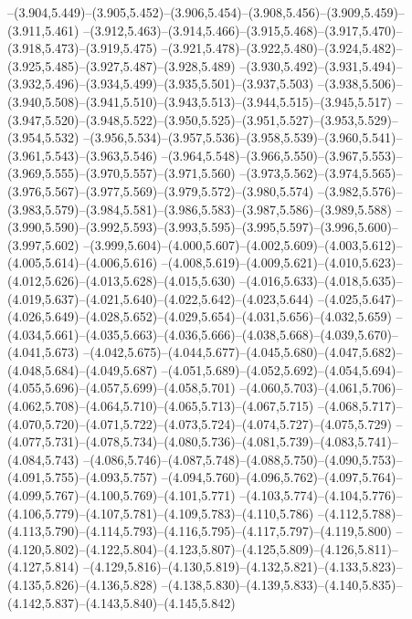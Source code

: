   --(3.904,5.449)--(3.905,5.452)--(3.906,5.454)--(3.908,5.456)--(3.909,5.459)--(3.911,5.461)%
  --(3.912,5.463)--(3.914,5.466)--(3.915,5.468)--(3.917,5.470)--(3.918,5.473)--(3.919,5.475)%
  --(3.921,5.478)--(3.922,5.480)--(3.924,5.482)--(3.925,5.485)--(3.927,5.487)--(3.928,5.489)%
  --(3.930,5.492)--(3.931,5.494)--(3.932,5.496)--(3.934,5.499)--(3.935,5.501)--(3.937,5.503)%
  --(3.938,5.506)--(3.940,5.508)--(3.941,5.510)--(3.943,5.513)--(3.944,5.515)--(3.945,5.517)%
  --(3.947,5.520)--(3.948,5.522)--(3.950,5.525)--(3.951,5.527)--(3.953,5.529)--(3.954,5.532)%
  --(3.956,5.534)--(3.957,5.536)--(3.958,5.539)--(3.960,5.541)--(3.961,5.543)--(3.963,5.546)%
  --(3.964,5.548)--(3.966,5.550)--(3.967,5.553)--(3.969,5.555)--(3.970,5.557)--(3.971,5.560)%
  --(3.973,5.562)--(3.974,5.565)--(3.976,5.567)--(3.977,5.569)--(3.979,5.572)--(3.980,5.574)%
  --(3.982,5.576)--(3.983,5.579)--(3.984,5.581)--(3.986,5.583)--(3.987,5.586)--(3.989,5.588)%
  --(3.990,5.590)--(3.992,5.593)--(3.993,5.595)--(3.995,5.597)--(3.996,5.600)--(3.997,5.602)%
  --(3.999,5.604)--(4.000,5.607)--(4.002,5.609)--(4.003,5.612)--(4.005,5.614)--(4.006,5.616)%
  --(4.008,5.619)--(4.009,5.621)--(4.010,5.623)--(4.012,5.626)--(4.013,5.628)--(4.015,5.630)%
  --(4.016,5.633)--(4.018,5.635)--(4.019,5.637)--(4.021,5.640)--(4.022,5.642)--(4.023,5.644)%
  --(4.025,5.647)--(4.026,5.649)--(4.028,5.652)--(4.029,5.654)--(4.031,5.656)--(4.032,5.659)%
  --(4.034,5.661)--(4.035,5.663)--(4.036,5.666)--(4.038,5.668)--(4.039,5.670)--(4.041,5.673)%
  --(4.042,5.675)--(4.044,5.677)--(4.045,5.680)--(4.047,5.682)--(4.048,5.684)--(4.049,5.687)%
  --(4.051,5.689)--(4.052,5.692)--(4.054,5.694)--(4.055,5.696)--(4.057,5.699)--(4.058,5.701)%
  --(4.060,5.703)--(4.061,5.706)--(4.062,5.708)--(4.064,5.710)--(4.065,5.713)--(4.067,5.715)%
  --(4.068,5.717)--(4.070,5.720)--(4.071,5.722)--(4.073,5.724)--(4.074,5.727)--(4.075,5.729)%
  --(4.077,5.731)--(4.078,5.734)--(4.080,5.736)--(4.081,5.739)--(4.083,5.741)--(4.084,5.743)%
  --(4.086,5.746)--(4.087,5.748)--(4.088,5.750)--(4.090,5.753)--(4.091,5.755)--(4.093,5.757)%
  --(4.094,5.760)--(4.096,5.762)--(4.097,5.764)--(4.099,5.767)--(4.100,5.769)--(4.101,5.771)%
  --(4.103,5.774)--(4.104,5.776)--(4.106,5.779)--(4.107,5.781)--(4.109,5.783)--(4.110,5.786)%
  --(4.112,5.788)--(4.113,5.790)--(4.114,5.793)--(4.116,5.795)--(4.117,5.797)--(4.119,5.800)%
  --(4.120,5.802)--(4.122,5.804)--(4.123,5.807)--(4.125,5.809)--(4.126,5.811)--(4.127,5.814)%
  --(4.129,5.816)--(4.130,5.819)--(4.132,5.821)--(4.133,5.823)--(4.135,5.826)--(4.136,5.828)%
  --(4.138,5.830)--(4.139,5.833)--(4.140,5.835)--(4.142,5.837)--(4.143,5.840)--(4.145,5.842)%
